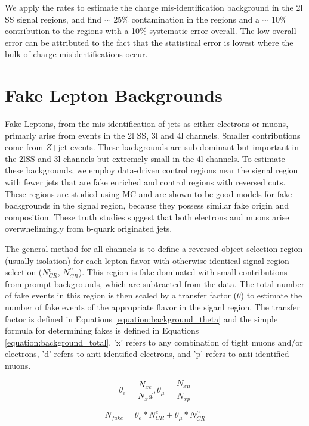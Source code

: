 We apply the rates to estimate the charge mis-identification background in the 2l SS signal regions, and find  $\sim$ 25\% contamination in the \ee regions and a $\sim$ 10\% contribution to the \emu regions with a 10\% systematic error overall. The low overall error can be attributed to the fact that the statistical error is lowest where the bulk of charge misidentifications occur.  


\section{Fake Lepton Backgrounds}

Fake Leptons, from the mis-identification of jets as either electrons or muons, primarly arise from \ttbar events in the 2l SS, 3l and 4l channels. Smaller contributions come from $Z$+jet events. These backgrounds are sub-dominant but important in the 2lSS and 3l channels but extremely small in the 4l channels. To estimate these backgrounds, we employ data-driven control regions near the signal region with fewer jets that are fake enriched and control regions with reversed cuts. These regions are studied using MC and are shown to be good models for fake backgrounds in the signal region, because they possess similar fake origin and composition. These truth studies suggest that both electrons and muons arise overwhelimingly from  b-quark originated jets.


The general method for all channels is to define a reversed object selection region (usually isolation) for each lepton flavor with otherwise identical signal region selection ($N^e_{CR}$, $N^{\mu}_{CR}$). This region is fake-dominated with small contributions from prompt backgrounds, which are subtracted from the data. The total number of fake events in this region is then scaled by a transfer factor ($\theta$) to estimate the number of fake events of the appropriate flavor in the siganl region. The transfer factor is defined in Equations \ref{equation:background_theta} and the simple formula for determining fakes is defined in Equations \ref{equation:background_total}. 'x' refers to any combination of tight muons and/or electrons, 'd' refers to anti-identified electrons, and 'p' refers to anti-identified muons.  


\begin{equation}
\theta_e = \frac{N_{xe}}{N_xd}, \theta_{\mu} = \frac{N_{x\mu}}{N_{xp}}
\label{equation:background_theta}
\end{equation}

\begin{equation}
N_{fake} = \theta_e * N^e_{CR} + \theta_{\mu} * N^{\mu}_{CR}   
\label{equation:background_total}
\end{equation}


